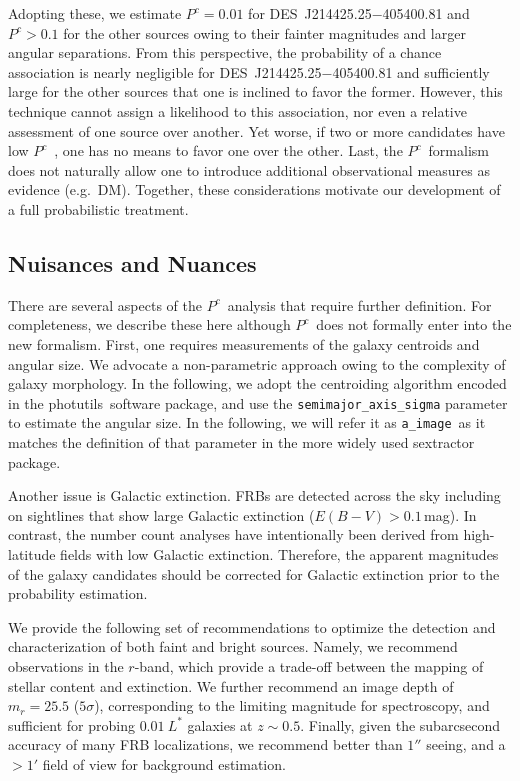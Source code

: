 \documentclass[twocolumn,linenumbers]{aastex63}
\newcommand{\mebv}{E(B-V)}
\newcommand{\photutils}{{\sc photutils}}
\newcommand{\aimage}{\texttt{a\_image}}
\newcommand{\mpchance}{P^c}
\newcommand{\pchance}{$\mpchance$}
\begin{document}
Adopting these, we estimate $\mpchance = 0.01$ for 
DES~J214425.25$-$405400.81 and $\mpchance > 0.1$ for
the other sources owing to their fainter magnitudes and
larger angular separations.  
From this perspective, the probability of a chance
association is nearly negligible for DES~J214425.25$-$405400.81 
and sufficiently large for the other sources that one is inclined
to favor the former.
However, this technique cannot assign a likelihood to
this association, nor even a relative assessment of one
source over another.
Yet worse, if two or more candidates have low \pchance\ 
\citep[e.g. FRB~181112;][]{Prochaska19b}, one has no means
to favor one over the other.
Last, the \pchance\ formalism does not naturally allow one
to introduce additional observational measures
as evidence (e.g.\ DM).
Together, these considerations motivate our development
of a full probabilistic treatment.

\subsection{Nuisances and Nuances}

There are several aspects of the \pchance\ analysis that require
further definition.
For completeness, we describe these here 
although \pchance\ does not formally enter into the
new formalism.
First, one requires measurements of the galaxy centroids
and angular size.
We advocate a non-parametric approach owing to the complexity
of galaxy morphology.
In the following, we adopt the centroiding algorithm 
encoded in the \photutils\ software package,
and use the \texttt {semimajor\_axis\_sigma} 
parameter to estimate the angular size. 
In the following, we will refer it as \aimage\ 
as it matches the definition of that parameter
in the more widely used {\sc sextractor} package.


Another issue is Galactic extinction.
FRBs are detected across the sky including on sightlines that
show large Galactic extinction ($\mebv > 0.1$\,mag).
In contrast, the number count analyses have intentionally
been derived from high-latitude fields with low
Galactic extinction.  Therefore, the apparent magnitudes
of the galaxy candidates should be corrected for 
Galactic extinction prior to the probability estimation.

We provide the following set of recommendations to optimize the detection and characterization of both faint and bright sources. Namely, we recommend observations in the $r$-band, which provide a trade-off between the mapping of stellar content and extinction. We further recommend an image depth of $m_r = 25.5$ ($5\sigma$), corresponding to the limiting magnitude for spectroscopy, and sufficient for probing $0.01 \ L^*$ galaxies at $z\sim 0.5$. Finally, given the subarcsecond accuracy of many FRB localizations, we recommend better than $1''$ seeing, and a $>1'$ field of view for background estimation. 
\end{document}
